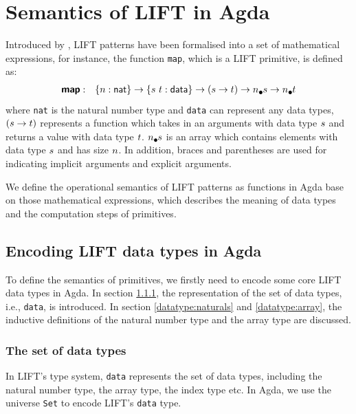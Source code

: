 \documentclass{l4proj}
\begin{document}
\chapter{Semantics of LIFT in Agda}
\label{ch:semantics}
Introduced by \cite{steuwer2015generating,DBLP:journals/corr/abs-1710-08332}, LIFT patterns have been formalised into a set of mathematical expressions, for instance, the function \texttt{map}, which is a LIFT primitive, is defined as:
\begin{align}
\label{lift:map}
    \prim{map}&:&\{\n : \natkind\} \to \{\dtone~\dttwo : \datatype\} \to (\dtone \to \dttwo) \to \lArray{n}{\dtone} \to \lArray{\n}{\dttwo}
\end{align}
where \texttt{nat} is the natural number type and \texttt{data} can represent any data types, $(s \to t)$ represents a function which takes in an arguments with data type $s$ and returns a value with data type $t$. $\lArray{n}{\dtone}$ is an array which contains elements with data type $s$ and has size $n$. In addition, braces and parentheses are used for indicating implicit arguments and explicit arguments.

We define the operational semantics of LIFT patterns as functions in Agda base on those mathematical expressions, which describes the meaning of data types and the computation steps of primitives.

\section{Encoding LIFT data types in Agda}
\label{sec:datatype}
To define the semantics of primitives, we firstly need to encode some core LIFT data types in Agda. In section \ref{datatypes:set}, the representation of the set of data types, i.e., \texttt{data}, is introduced. In section \ref{datatype:naturals} and \ref{datatype:array}, the inductive definitions of the natural number type and the array type are discussed.

\subsection{The set of data types}
\label{datatypes:set}
In LIFT's type system, \texttt{data} represents the set of data types, including the natural number type, the array type, the index type etc. In Agda, we use the universe \texttt{Set} to encode LIFT's \texttt{data} type. 
\end{document}

